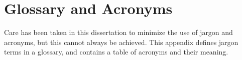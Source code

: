 \chapter{Glossary and Acronyms}
\label{app_glossary}
Care has been taken in this dissertation to minimize the use of jargon and
acronyms, but this cannot always be achieved.  This appendix defines
jargon terms in a glossary, and contains a table of acronyms and their
meaning.

